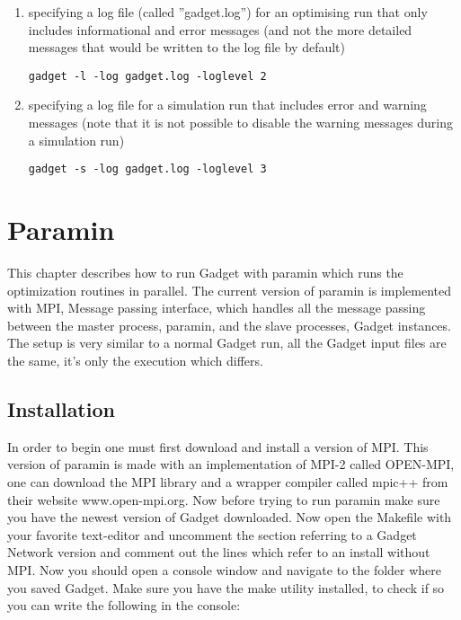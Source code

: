 \documentclass[10pt,twoside]{book}
\begin{document}
\begin{enumerate}
\item specifying a log file (called ''gadget.log'') for an optimising run that only includes informational and error messages (and not the more detailed messages that would be written to the log file by default)
{\small\begin{verbatim}
gadget -l -log gadget.log -loglevel 2
\end{verbatim}}
\item specifying a log file for a simulation run that includes error and warning messages (note that it is not possible to disable the warning messages during a simulation run)
{\small\begin{verbatim}
gadget -s -log gadget.log -loglevel 3
\end{verbatim}}
\end{enumerate}


\chapter{Paramin}\label{chap:paramin}
This chapter describes how to run Gadget with paramin which runs the optimization routines in parallel. The current version of paramin is implemented with MPI, Message passing interface, which handles all the message passing between the master process, paramin, and the slave processes, Gadget instances. The setup is very similar to a normal Gadget run, all the Gadget input files are the same, it's only the execution which differs. 

\section{Installation}\label{sec:paramininstall}
In order to begin one must first download and install a version of MPI. This version of paramin is made with an implementation of MPI-2 called
OPEN-MPI, one can download the MPI library and a wrapper compiler called mpic++ from their website www.open-mpi.org. Now before trying to run paramin
make sure you have the newest version of Gadget downloaded. Now open the Makefile with your favorite text-editor and uncomment the section referring
to a Gadget Network version and comment out the lines which refer to an install without MPI. Now you should open a console window and navigate to the 
folder where you saved Gadget. Make sure you have the make utility installed, to check if so you can write the following in the console:
\end{document}
